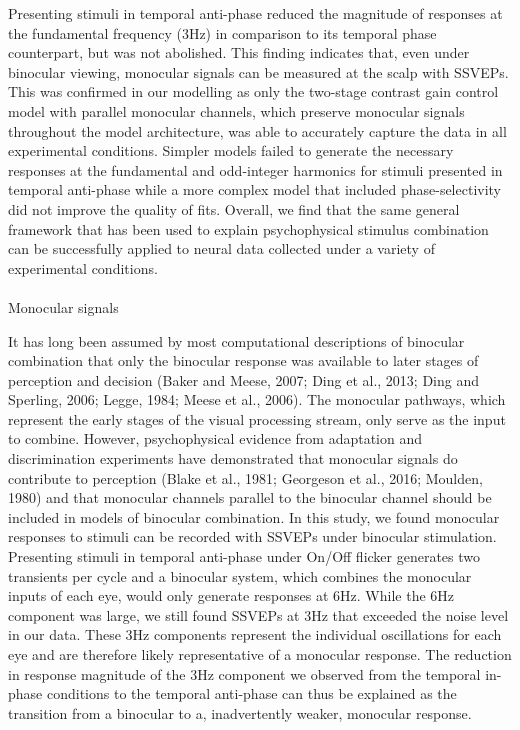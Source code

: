 \documentclass[
  12pt,
]{article}
\makeatletter
\let\oldparagraph\paragraph
\renewcommand{\paragraph}{
    \@ifstar
      \xxxParagraphStar
      \xxxParagraphNoStar
  }
\newcommand{\xxxParagraphStar}[1]{\oldparagraph*{#1}\mbox{}}
\newcommand{\xxxParagraphNoStar}[1]{\oldparagraph{#1}\mbox{}}
\makeatother
\begin{document}
Presenting stimuli in temporal anti-phase reduced the magnitude of
responses at the fundamental frequency (3Hz) in comparison to its
temporal phase counterpart, but was not abolished. This finding
indicates that, even under binocular viewing, monocular signals can be
measured at the scalp with SSVEPs. This was confirmed in our modelling
as only the two-stage contrast gain control model with parallel
monocular channels, which preserve monocular signals throughout the
model architecture, was able to accurately capture the data in all
experimental conditions. Simpler models failed to generate the necessary
responses at the fundamental and odd-integer harmonics for stimuli
presented in temporal anti-phase while a more complex model that
included phase-selectivity did not improve the quality of fits. Overall,
we find that the same general framework that has been used to explain
psychophysical stimulus combination can be successfully applied to
neural data collected under a variety of experimental conditions.

\paragraph{Monocular signals}\label{monocular-signals}

It has long been assumed by most computational descriptions of binocular
combination that only the binocular response was available to later
stages of perception and decision (Baker and Meese, 2007; Ding et al.,
2013; Ding and Sperling, 2006; Legge, 1984; Meese et al., 2006). The
monocular pathways, which represent the early stages of the visual
processing stream, only serve as the input to combine. However,
psychophysical evidence from adaptation and discrimination experiments
have demonstrated that monocular signals do contribute to perception
(Blake et al., 1981; Georgeson et al., 2016; Moulden, 1980) and that
monocular channels parallel to the binocular channel should be included
in models of binocular combination. In this study, we found monocular
responses to stimuli can be recorded with SSVEPs under binocular
stimulation. Presenting stimuli in temporal anti-phase under On/Off
flicker generates two transients per cycle and a binocular system, which
combines the monocular inputs of each eye, would only generate responses
at 6Hz. While the 6Hz component was large, we still found SSVEPs at 3Hz
that exceeded the noise level in our data. These 3Hz components
represent the individual oscillations for each eye and are therefore
likely representative of a monocular response. The reduction in response
magnitude of the 3Hz component we observed from the temporal in-phase
conditions to the temporal anti-phase can thus be explained as the
transition from a binocular to a, inadvertently weaker, monocular
response.
\end{document}
